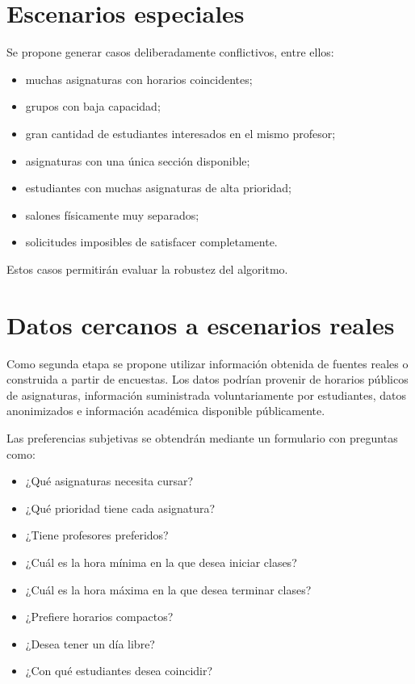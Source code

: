\documentclass[11pt]{article}
\numberwithin{equation}{section}
\numberwithin{figure}{section}
\numberwithin{table}{section}
\theoremstyle{definition}
\begin{document}
\section{Escenarios especiales}

Se propone generar casos deliberadamente conflictivos, entre ellos:

\begin{itemize}
  \item muchas asignaturas con horarios coincidentes;
  \item grupos con baja capacidad;
  \item gran cantidad de estudiantes interesados en el mismo profesor;
  \item asignaturas con una única sección disponible;
  \item estudiantes con muchas asignaturas de alta prioridad;
  \item salones físicamente muy separados;
  \item solicitudes imposibles de satisfacer completamente.
\end{itemize}

Estos casos permitirán evaluar la robustez del algoritmo.

\section{Datos cercanos a escenarios reales}

Como segunda etapa se propone utilizar información obtenida de fuentes reales
o construida a partir de encuestas. Los datos podrían provenir de horarios
públicos de asignaturas, información suministrada voluntariamente por
estudiantes, datos anonimizados e información académica disponible
públicamente.

Las preferencias subjetivas se obtendrán mediante un formulario con preguntas
como:

\begin{itemize}
  \item ¿Qué asignaturas necesita cursar?
  \item ¿Qué prioridad tiene cada asignatura?
  \item ¿Tiene profesores preferidos?
  \item ¿Cuál es la hora mínima en la que desea iniciar clases?
  \item ¿Cuál es la hora máxima en la que desea terminar clases?
  \item ¿Prefiere horarios compactos?
  \item ¿Desea tener un día libre?
  \item ¿Con qué estudiantes desea coincidir?
\end{itemize}
\end{document}
